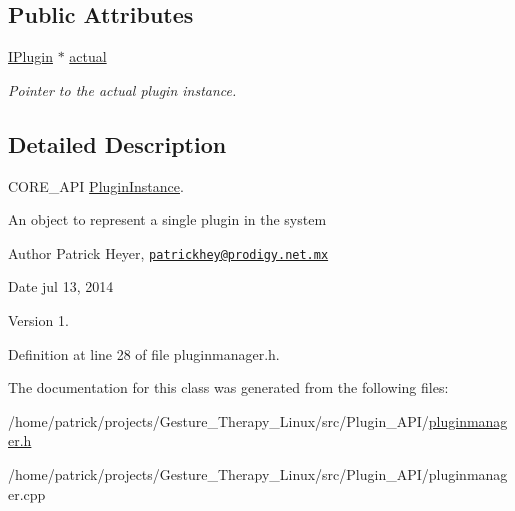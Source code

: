 \subsection*{Public Attributes}
\begin{DoxyCompactItemize}
\item 
\mbox{\label{class_plugin_instance_ae9a6b5246d5daf974d12a15c7949407b}} 
\hyperlink{class_i_plugin}{I\+Plugin} $\ast$ \hyperlink{class_plugin_instance_ae9a6b5246d5daf974d12a15c7949407b}{actual}
\begin{DoxyCompactList}\small\item\em Pointer to the actual plugin instance. \end{DoxyCompactList}\end{DoxyCompactItemize}


\subsection{Detailed Description}
C\+O\+R\+E\+\_\+\+A\+PI \hyperlink{class_plugin_instance}{Plugin\+Instance}. 

An object to represent a single plugin in the system

\begin{DoxyAuthor}{Author}
Patrick Heyer, \href{mailto:patrickhey@prodigy.net.mx}{\tt patrickhey@prodigy.\+net.\+mx} 
\end{DoxyAuthor}
\begin{DoxyDate}{Date}
jul 13, 2014 
\end{DoxyDate}
\begin{DoxyVersion}{Version}
1. 
\end{DoxyVersion}


Definition at line 28 of file pluginmanager.\+h.



The documentation for this class was generated from the following files\+:\begin{DoxyCompactItemize}
\item 
/home/patrick/projects/\+Gesture\+\_\+\+Therapy\+\_\+\+Linux/src/\+Plugin\+\_\+\+A\+P\+I/\hyperlink{pluginmanager_8h}{pluginmanager.\+h}\item 
/home/patrick/projects/\+Gesture\+\_\+\+Therapy\+\_\+\+Linux/src/\+Plugin\+\_\+\+A\+P\+I/pluginmanager.\+cpp\end{DoxyCompactItemize}
